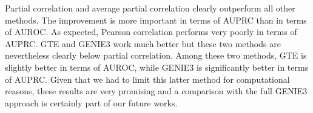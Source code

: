 \documentclass[wcp]{jmlr}
\begin{document}





Partial correlation and average partial correlation clearly outperform all
other methods. The improvement is more important in terms of AUPRC than in
terms of AUROC. As expected, Pearson correlation performs very poorly in terms
of AUPRC. GTE and GENIE3 work much better but these two methods are
nevertheless clearly below partial correlation. Among these two methods, GTE is
slightly better in terms of AUROC, while GENIE3 is significantly better in
terms of AUPRC. Given that we had to limit this latter method for computational
reasons, these results are very promising and a comparison with the full GENIE3
approach is certainly part of our future works.
\end{document}
